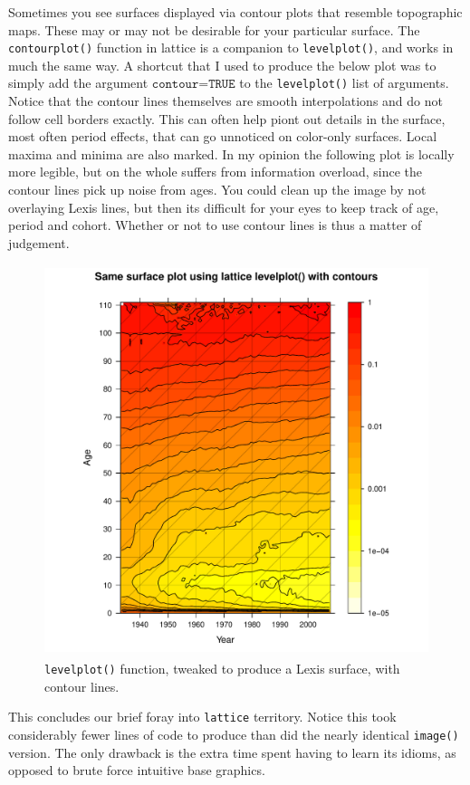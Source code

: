 \documentclass[a4paper]{article}
\begin{document}
Sometimes you see surfaces displayed via contour plots that resemble topographic maps. These may or may not be desirable for your particular surface. The \texttt{contourplot()} function in lattice is a companion to \texttt{levelplot()}, and works in much the same way. A shortcut that I used to produce the below plot was to simply add the argument $\texttt{contour=TRUE}$ to the \texttt{levelplot()} list of arguments. Notice that the contour lines themselves are smooth interpolations and do not follow cell borders exactly. This can often help piont out details in the surface, most often period effects, that can go unnoticed on color-only surfaces. Local maxima and minima are also marked. In my opinion the following plot is locally more legible, but on the whole suffers from information overload, since the contour lines pick up noise from ages. You could clean up the image by not overlaying Lexis lines, but then its difficult for your eyes to keep track of age, period and cohort. Whether or not to use contour lines is thus a matter of judgement.





\begin{figure}[H]
\centering
\includegraphics[width=4.5in,height=4.5in]{figs/latticegoodcontour.pdf}
\caption{\texttt{levelplot()} function, tweaked to produce a Lexis surface, with contour lines.}
\end{figure}


This concludes our brief foray into \texttt{lattice} territory. Notice this took considerably fewer lines of code to produce than did the nearly identical \texttt{image()} version. The only drawback is the extra time spent having to learn its idioms, as opposed to brute force intuitive base graphics.
\end{document}
